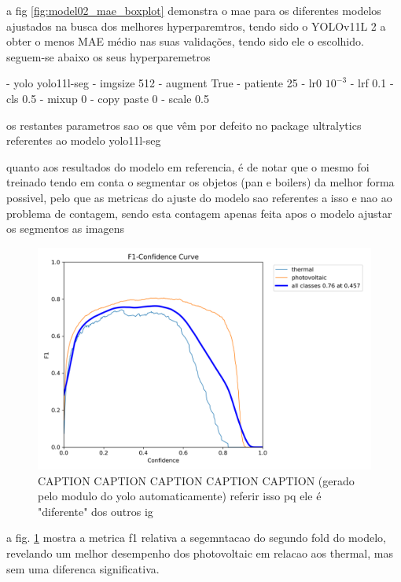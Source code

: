 \documentclass[conference]{IEEEtran}
\begin{document}
a fig \ref{fig:model02_mae_boxplot} demonstra o mae para os diferentes modelos ajustados na busca dos melhores hyperparemtros, tendo sido o YOLOv11L 2 a obter o menos MAE médio nas suas validações, tendo sido ele o escolhido. seguem-se abaixo os seus hyperparemetros

- yolo yolo11l-seg
- imgsize 512
- augment True
- patiente 25
- lr0 $10^{-3}$
- lrf 0.1
- cls 0.5
- mixup 0
- copy paste 0
- scale 0.5

os restantes parametros sao os que vêm por defeito no package ultralytics
referentes ao modelo yolo11l-seg

quanto aos resultados do modelo em referencia, é de notar que o mesmo foi treinado tendo em conta o segmentar os objetos (pan e boilers) da melhor forma possivel, pelo que as metricas do ajuste do modelo sao referentes a isso e nao ao problema de contagem, sendo esta contagem apenas feita apos o modelo ajustar os segmentos as imagens

\begin{figure}[H]
    \centering
    \includegraphics[width=1\linewidth]{assets/model02_yolof1.png}
    \caption{CAPTION CAPTION CAPTION CAPTION CAPTION (gerado pelo modulo do yolo automaticamente) referir isso pq ele é "diferente" dos outros ig}
    \label{fig:model02_yolof1}
\end{figure}

a fig. \ref{fig:model02_yolof1} mostra a metrica f1 relativa a segemntacao do segundo fold do modelo, revelando um melhor desempenho dos photovoltaic em relacao aos thermal, mas sem uma diferenca significativa.
\end{document}
